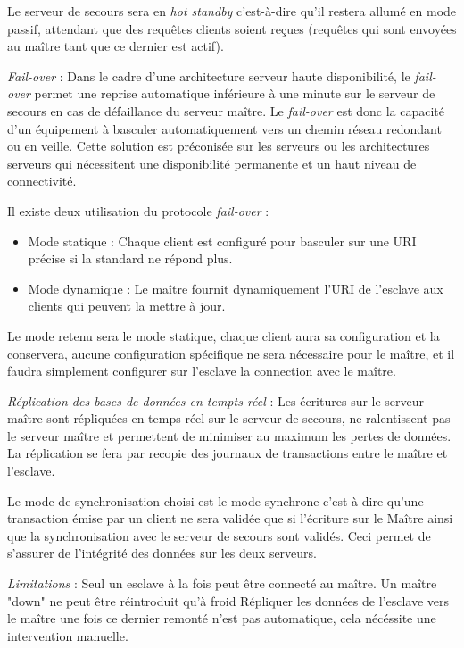 Le serveur de secours sera en \textit{hot standby} c'est-à-dire qu'il restera allumé en mode passif, attendant que des requêtes clients soient reçues (requêtes qui sont envoyées au maître tant que ce dernier est actif).


\textit{Fail-over} : Dans le cadre d'une architecture serveur haute disponibilité, le \textit{fail-over} permet une reprise automatique inférieure à une minute sur le serveur de secours en cas de défaillance du serveur maître. Le \textit{fail-over} est donc la capacité d'un équipement à basculer automatiquement vers un chemin réseau redondant ou en veille. Cette solution est préconisée sur les serveurs ou les architectures serveurs qui nécessitent une disponibilité permanente et un haut niveau de connectivité.


Il existe deux utilisation du protocole \textit{fail-over} :
\begin{itemize}
\item Mode statique : Chaque client est configuré pour basculer sur une URI précise si la standard ne répond plus.
\item Mode dynamique : Le maître fournit dynamiquement l'URI de l'esclave aux clients qui peuvent la mettre à jour.
\end{itemize}
Le mode retenu sera le mode statique, chaque client aura sa configuration et la conservera, aucune configuration spécifique ne sera nécessaire pour le maître, et il faudra simplement configurer sur l'esclave la connection avec le maître.


\textit{Réplication des bases de données en tempts réel} : 
Les écritures sur le serveur maître sont répliquées en temps réel sur le serveur de secours, ne ralentissent pas le serveur maître et permettent de minimiser au maximum les pertes de données. La réplication se fera par recopie des journaux de transactions entre le maître et l'esclave.

Le mode de synchronisation choisi est le mode synchrone c'est-à-dire qu'une transaction émise par un client ne sera validée que si l'écriture sur le Maître ainsi que la synchronisation avec le serveur de secours sont validés. Ceci permet de s'assurer de l'intégrité des données sur les deux serveurs. 


\textit{Limitations} :
Seul un esclave à la fois peut être connecté au maître.
Un maître "down" ne peut être réintroduit qu'à froid
Répliquer les données de l'esclave vers le maître une fois ce dernier remonté n'est pas automatique, cela nécéssite une intervention manuelle.


